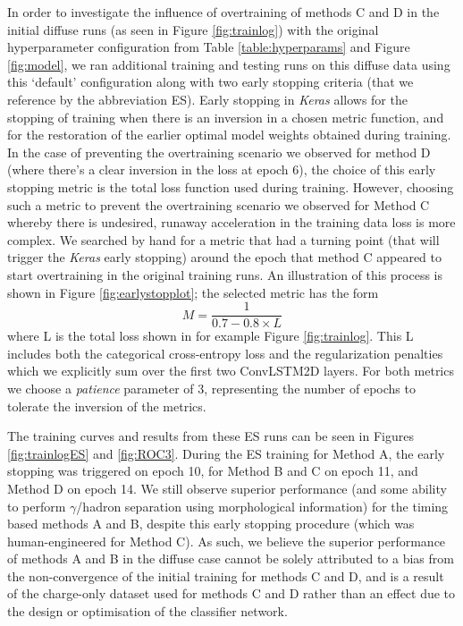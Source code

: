 In order to investigate the influence of overtraining of methods C and D in the initial diffuse runs (as seen in Figure \ref{fig:trainlog}) with the original hyperparameter configuration from Table \ref{table:hyperparams} and Figure \ref{fig:model}, we ran additional training and testing runs on this diffuse data using this `default' configuration along with two early stopping criteria (that we reference by the abbreviation ES). Early stopping in \textit{Keras} allows for the stopping of training when there is an inversion in a chosen metric function, and for the restoration of the earlier optimal model weights obtained during training. In the case of preventing the overtraining scenario we observed for method D (where there's a clear inversion in the loss at epoch 6), the choice of this early stopping metric is the total loss function used during training. However, choosing such a metric to prevent the overtraining scenario we observed for Method C whereby there is undesired, runaway acceleration in the training data loss is more complex. We searched by hand for a metric that had a turning point (that will trigger the \textit{Keras} early stopping) around the epoch that method C appeared to start overtraining in the original training runs. An illustration of this process is shown in Figure \ref{fig:earlystopplot}; the selected metric has the form
\begin{equation}
    M=\frac{1}{0.7-0.8 \times L}
\end{equation}
where L is the total loss shown in for example Figure \ref{fig:trainlog}. This L includes both the categorical cross-entropy loss and the regularization penalties which we explicitly sum over the first two ConvLSTM2D layers. For both metrics we choose a \textit{patience} parameter of 3, representing the number of epochs to tolerate the inversion of the metrics.

The training curves and results from these ES runs can be seen in Figures \ref{fig:trainlogES} and \ref{fig:ROC3}. During the ES training for Method A, the early stopping was triggered on epoch 10, for Method B and C on epoch 11, and Method D on epoch 14. We still observe superior performance (and some ability to perform $\gamma$/hadron separation using morphological information) for the timing based methods A and B, despite this early stopping procedure (which was human-engineered for Method C). As such, we believe the superior performance of methods A and B in the diffuse case cannot be solely attributed to a bias from the non-convergence of the initial training for methods C and D, and is a result of the charge-only dataset used for methods C and D rather than an effect due to the design or optimisation of the classifier network.


